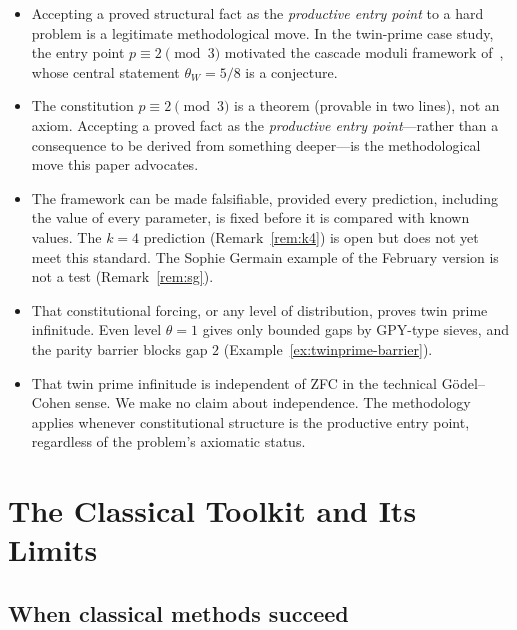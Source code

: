 \documentclass[12pt]{amsart}
\theoremstyle{plain}
\theoremstyle{definition}
\theoremstyle{remark}
\begin{document}
\begin{itemize}
  \item[\textbf{[Claimed]}] Accepting a proved structural fact as the
    \emph{productive entry point} to a hard problem is a legitimate
    methodological move. In the twin-prime case study, the entry point
    $p \equiv 2 \pmod{3}$ motivated the cascade moduli framework
    of~\cite{WakilEisenstein}, whose central statement $\theta_W = 5/8$ is a
    conjecture.

  \item[\textbf{[Claimed]}] The constitution $p \equiv 2 \pmod{3}$ is a theorem
    (provable in two lines), not an axiom. Accepting a proved fact as the
    \emph{productive entry point}---rather than a consequence to be derived
    from something deeper---is the methodological move this paper advocates.

  \item[\textbf{[Claimed]}] The framework can be made falsifiable, provided
    every prediction, including the value of every parameter, is fixed before
    it is compared with known values. The $k = 4$ prediction
    (Remark~\ref{rem:k4}) is open but does not yet meet this standard. The
    Sophie Germain example of the February version is not a test
    (Remark~\ref{rem:sg}).

  \item[\textbf{[Not claimed]}] That constitutional forcing, or any level of
    distribution, proves twin prime infinitude. Even level $\theta = 1$ gives
    only bounded gaps by GPY-type sieves, and the parity barrier blocks gap $2$
    (Example~\ref{ex:twinprime-barrier}).

  \item[\textbf{[Not claimed]}] That twin prime infinitude is independent of
    ZFC in the technical G\"odel--Cohen sense. We make no claim about
    independence. The methodology applies whenever constitutional structure is
    the productive entry point, regardless of the problem's axiomatic status.
\end{itemize}

\section{The Classical Toolkit and Its Limits}

\subsection{When classical methods succeed}
\end{document}
